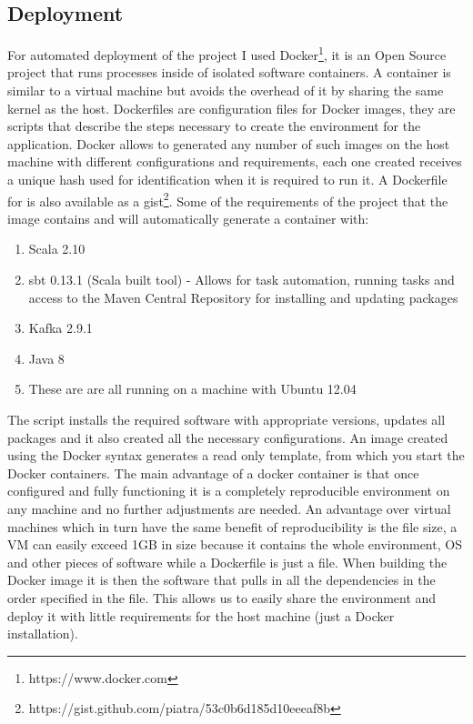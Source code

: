 \subsection{Deployment}
\label{deployment}
For automated deployment of the project I used Docker\footnote{https://www.docker.com}, it is an Open Source project that runs processes inside of isolated software containers. A container is similar to a virtual machine but avoids the overhead of it by sharing the same kernel as the host. Dockerfiles are configuration files for Docker images, they are scripts that describe the steps necessary to create the environment for the application. Docker allows to generated any number of such images on the host machine with different configurations and requirements, each one created receives a unique hash used for identification when it is required to run it. A Dockerfile for \project  is also available as a gist\footnote{https://gist.github.com/piatra/53c0b6d185d10eeeaf8b}. Some of the requirements of the project that the image contains and will automatically generate a container with:
\begin{enumerate}
	\item Scala 2.10
	\item sbt 0.13.1 (Scala built tool) - Allows for task automation, running tasks and access to the Maven Central Repository for installing and updating packages 
	\item Kafka 2.9.1
	\item Java 8
	\item These are are all running on a machine with Ubuntu 12.04
\end{enumerate}
The script installs the required software with appropriate versions, updates all packages and it also created all the necessary configurations.
An image created using the Docker syntax generates a read only template, from which you start the Docker containers. The main advantage of a docker container is that once configured and fully functioning it is a completely reproducible environment on any machine and no further adjustments are needed. An advantage over virtual machines which in turn have the same benefit of reproducibility is the file size, a VM can easily exceed 1GB in size because it contains the whole environment, OS and other pieces of software while a Dockerfile is just a file. When building the Docker image it is then the software that pulls in all the dependencies in the order specified in the file. This allows us to easily share the environment and deploy it with little requirements for the host machine (just a Docker installation).
